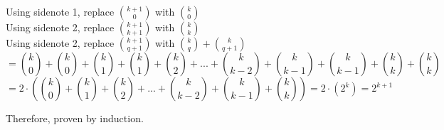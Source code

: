 \documentclass[a4paper]{article}
\numberwithin{equation}{subsection}
\begin{document}
Using sidenote 1, replace ${k+1 \choose 0}$ with ${k \choose 0}$\\

Using sidenote 2, replace ${k+1 \choose k+1}$ with ${k \choose k}$\\

Using sidenote 2, replace ${k+1 \choose q+1}$ with ${k \choose q} +{k \choose q+1}$\\

$$={k \choose 0} + {k \choose 0}+ {k \choose 1} + {k \choose 1}+ {k \choose 2}+...+{k \choose k-2}+{k \choose k-1}+{k \choose k-1}+{k \choose k}+{k \choose k}$$
$$=2 \cdot ({k \choose 0} + {k \choose 1} +
{k \choose 2}+...+{k \choose k-2}+{k \choose k-1}+{k \choose k}) =2 \cdot (2^k)= 2^{k+1}$$

Therefore, proven by induction.
\end{document}
